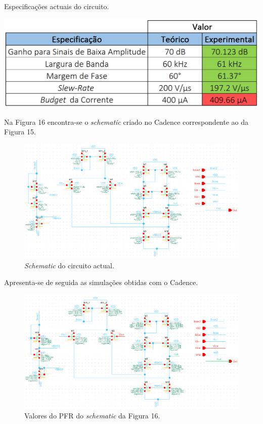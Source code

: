 \documentclass[11pt]{article}
\numberwithin{equation}{section}
\begin{document}
\begin{table}[H]
	\centering
	\caption{Especificações actuais do circuito.}
	\vspace{-1.5mm}
	\includegraphics[keepaspectratio=true, scale=0.40]{teoricas/specsajustesF1}
\end{table}

Na Figura 16 encontra-se o \textit{schematic} criado no Cadence correspondente ao da Figura 15.

\begin{figure}[H]
	\centering
	\includegraphics[keepaspectratio=true, scale=0.75]{exps/schematicajustesF1}
	\vspace{-0.5em}
	\caption{\textit{Schematic} do circuito actual.}
	\vspace{-0.8em}
\end{figure} 

Apresenta-se de seguida as simulações obtidas com o Cadence.

\begin{figure}[H]
	\centering
	\includegraphics[keepaspectratio=true, scale=0.85]{exps/PFRajustesF1}
	\vspace{-0.5em}
	\caption{Valores do PFR do \textit{schematic} da Figura 16.}
	\vspace{-0.8em}
\end{figure} 
\end{document}
